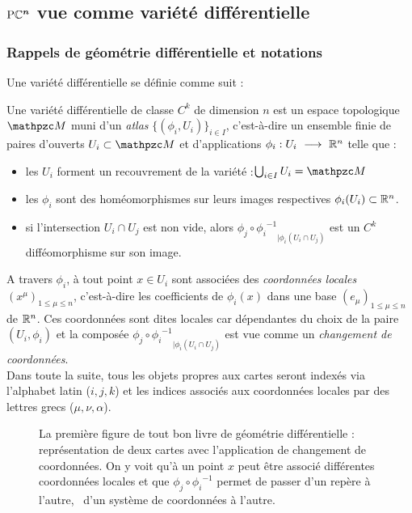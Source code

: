\subsection{$\boldsymbol{\text{\normalfont P}\mathbb{C}^{n}}$ vue comme variété différentielle} \label{subsec:construc_PC^n}

\subsubsection{Rappels de géométrie différentielle et notations}\label{subsec:rappel2geo_diff}

Une variété différentielle se définie comme suit :
\begin{definition} \label{defvarietoche}
	Une variété différentielle de classe $C^k$ de dimension $n$ est un espace topologique
	$\manu$ muni d'un \emph{atlas} $\big\{ (\phi_i, U_i) \big\}_{i\in I}$, c'est-à-dire un ensemble finie de paires d'ouverts $U_i\subset \manu$ et d'applications $\phi_i :U_i\ \longrightarrow\ \mathbb{R}^n$ telle que :
	\begin{itemize}
		
		\item les $U_i$ forment un recouvrement de la variété :\qquad $\bigcup_{i\in I} U_i = \manu$
		
		\item les $\phi_i$ sont des homéomorphismes sur leurs images respectives $\phi_i(U_i)\subset\mathbb{R}^n$.
		
		\item si l'intersection $U_i \cap U_j$ est non vide, alors ${\phi_j \circ {\phi_i}^{-1}}_{| {\phi_i}(U_i\cap U_j)}$ est un $C^k$ difféomorphisme sur son image.
		
	\end{itemize}
	A travers $\phi_i$, à tout point $x\in U_i$ sont associées des \emph{coordonnées locales} $(x^\mu)_{1\leq \mu\leq n}$, c'est-à-dire les coefficients de $\phi_i(x)$ dans une base $(e_\mu)_{1\leq \mu\leq n}$ de $\mathbb{R}^n$. Ces coordonnées sont dites locales car dépendantes du choix de la paire $(U_i,\phi_i)$ et la composée ${\phi_j \circ {\phi_i}^{-1}}_{| {\phi_i}(U_i\cap U_j)}$ est vue comme un \emph{changement de coordonnées}.\\
	Dans toute la suite, tous les objets propres aux cartes seront indexés via l'alphabet latin ($i,j,k$) et les indices associés aux coordonnées locales par des lettres grecs ($\mu,\nu,\alpha$).
\end{definition}

\begin{figure}[h]
	
	\caption[\DONE La première figure de tout bon livre de géométrie différentielle]{La première figure de tout bon livre de géométrie différentielle : représentation de deux cartes avec l'application de changement de coordonnées. On y voit qu'à un point $x$ peut être associé différentes coordonnées locales et que $\phi_j \circ {\phi_i}^{-1}$ permet de passer d'un repère à l'autre, \ie~d'un système de coordonnées à l'autre.}
\end{figure}

